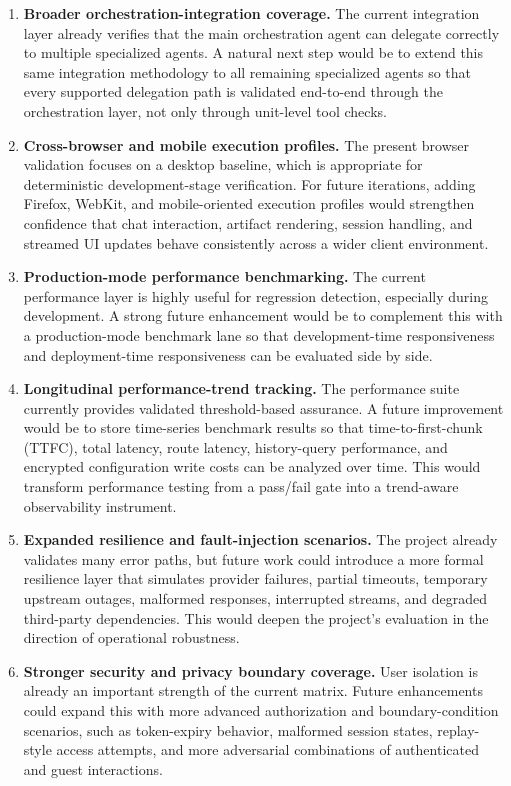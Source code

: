 \documentclass[11pt,a4paper]{report}
\begin{document}
\begin{enumerate}
  \item \textbf{Broader orchestration-integration coverage.} The current integration layer already verifies that the main orchestration agent can delegate correctly to multiple specialized agents. A natural next step would be to extend this same integration methodology to all remaining specialized agents so that every supported delegation path is validated end-to-end through the orchestration layer, not only through unit-level tool checks.
  \item \textbf{Cross-browser and mobile execution profiles.} The present browser validation focuses on a desktop baseline, which is appropriate for deterministic development-stage verification. For future iterations, adding Firefox, WebKit, and mobile-oriented execution profiles would strengthen confidence that chat interaction, artifact rendering, session handling, and streamed UI updates behave consistently across a wider client environment.
  \item \textbf{Production-mode performance benchmarking.} The current performance layer is highly useful for regression detection, especially during development. A strong future enhancement would be to complement this with a production-mode benchmark lane so that development-time responsiveness and deployment-time responsiveness can be evaluated side by side.
  \item \textbf{Longitudinal performance-trend tracking.} The performance suite currently provides validated threshold-based assurance. A future improvement would be to store time-series benchmark results so that time-to-first-chunk (TTFC), total latency, route latency, history-query performance, and encrypted configuration write costs can be analyzed over time. This would transform performance testing from a pass/fail gate into a trend-aware observability instrument.
  \item \textbf{Expanded resilience and fault-injection scenarios.} The project already validates many error paths, but future work could introduce a more formal resilience layer that simulates provider failures, partial timeouts, temporary upstream outages, malformed responses, interrupted streams, and degraded third-party dependencies. This would deepen the project's evaluation in the direction of operational robustness.
  \item \textbf{Stronger security and privacy boundary coverage.} User isolation is already an important strength of the current matrix. Future enhancements could expand this with more advanced authorization and boundary-condition scenarios, such as token-expiry behavior, malformed session states, replay-style access attempts, and more adversarial combinations of authenticated and guest interactions.

\end{enumerate}
\end{document}
